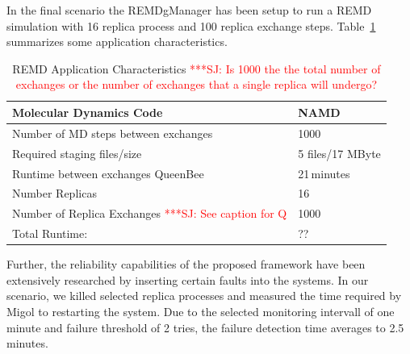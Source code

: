 \documentclass[times, 10pt,twocolumn]{article}
\newcommand{\jhanote}[1]{ {\textcolor{red} { ***SJ: #1 }}}
\newcommand{\jhanote}[1]{}
\begin{document}
In the final scenario the REMDgManager has been setup to run a REMD simulation with 16 replica process 
and 100 replica exchange steps. Table~\ref{tab:app_stats} summarizes some application characteristics.
\begin{table}        
    \centering
	\begin{tabular}{|p{5cm}|l|}
          \hline
          Molecular Dynamics Code &NAMD\\ \hline
          Number of MD steps between exchanges &1000\\ \hline 
          Required staging files/size &5 files/17 MByte\\ \hline
          Runtime between exchanges QueenBee &21\,minutes\\ \hline   
          Number Replicas &16 \\ \hline
          Number of Replica Exchanges \jhanote{See caption for Q} &1000\\ \hline
          Total Runtime: &??   \\ \hline
	\end{tabular}
	\caption{REMD Application Characteristics\label{tab:app_stats}
          \jhanote{Is 1000 the the total number of exchanges or the number of exchanges that a single replica will undergo?}}
\end{table}

Further, the reliability capabilities of the proposed framework have been extensively researched by inserting certain faults into 
the systems. In our scenario, we killed selected replica processes and measured the time required by Migol to restarting the system.
Due to the selected monitoring intervall of one minute and failure threshold of 2 tries, the failure detection time averages to 2.5\, minutes.
\end{document}
